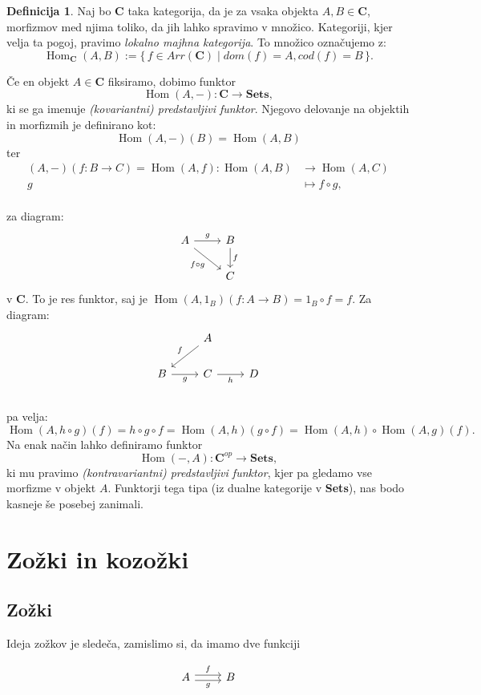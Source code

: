 \documentclass[12pt,a4paper]{book}
\theoremstyle{definition}
\newtheorem{definicija}{Definicija}[chapter]
\theoremstyle{plain}
\theoremstyle{definition}
\theoremstyle{remark}
\newcommand{\cat}[1]{\textbf{#1}}
\DeclareMathOperator{\Hom}{Hom}
\renewcommand{\set}[1]{\{\,#1\,\}}
\begin{document}
\begin{definicija}

Naj bo $\cat{C}$ taka kategorija, da je za vsaka objekta $A,B \in \cat{C}$, morfizmov med njima toliko, da jih lahko spravimo v množico. Kategoriji, kjer velja ta pogoj, pravimo \emph{lokalno majhna kategorija}. To množico označujemo z:
$$\Hom_{\cat{C}}(A,B) := \set{f \in Arr(\cat{C}) \mid dom(f) = A, cod(f) = B}.$$
\end{definicija}
Če en objekt $A \in \cat{C}$ fiksiramo, dobimo funktor
$$\Hom(A,-) : \cat{C} \to \cat{Sets},$$
ki se ga imenuje \emph{(kovariantni) predstavljivi funktor}. Njegovo delovanje na objektih in morfizmih je definirano kot:
$$\Hom(A,-)(B) = \Hom(A,B)$$
ter
\begin{align*}
(A,-)(f : B \to C) = \Hom(A,f): \Hom(A,B) &\to \Hom(A,C) \\
g &\mapsto f \circ g, \\
\end{align*}

za diagram:
$$ \begin{tikzcd}
A \ar[r, "g"] \ar[rd, "f \circ g"'] & B \ar[d, "f"] \\
& C
\end{tikzcd} $$
v $\cat{C}$.
To je res funktor, saj je $\Hom(A,1_B)(f:A \to B) = 1_B \circ f = f$. Za diagram: 
$$ \begin{tikzcd}
& A \ar[dl, "f"'] & \\
B \ar[r, "g"'] & C \ar[r, "h"'] & D \\
\end{tikzcd} $$
pa velja:
$$
\Hom(A,h \circ g)(f) = h \circ g \circ f = \Hom(A,h)(g \circ f) = \Hom(A,h) \circ \Hom(A,g)(f).
$$
Na enak način lahko definiramo funktor
$$\Hom(-,A) : \cat{C}^{op} \to \cat{Sets},$$
ki mu pravimo \emph{(kontravariantni) predstavljivi funktor},
kjer pa gledamo vse morfizme v objekt $A$. Funktorji tega tipa (iz dualne kategorije v \cat{Sets}), nas bodo kasneje še posebej zanimali.

\section{Zožki in kozožki}

\subsection{Zožki}
Ideja zožkov je sledeča, zamislimo si, da imamo dve funkciji

$$\begin{tikzcd}
A \ar[r, shift left, "f"] \ar[r, shift right, "g"'] & B 
\end{tikzcd}$$
\end{document}
